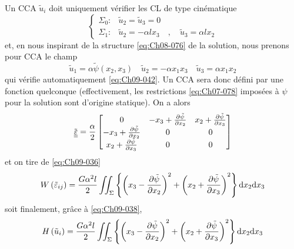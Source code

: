 Un CCA $\tilde{u}_i$ doit uniquement vérifier les CL de type cinématique 
\begin{equation}
    \left\{
    \begin{aligned}
        \Sigma_0: & \tilde{u}_2 = \tilde{u}_3 = 0 \\
        \Sigma_1: & \tilde{u}_2 = -\alpha l x_3 \quad, \quad \tilde{u}_3 = \alpha l x_2
    \end{aligned}
    \right.
    \label{eq:Ch09-042}
\end{equation}
et, en nous inspirant de la structure \eqref{eq:Ch08-076} de la solution, nous prenons pour CCA le champ 
\begin{equation}
    \tilde{u}_1 = \alpha \tilde{\psi} (x_2, x_3) \quad \tilde{u}_2 = -\alpha x_1 x_3 \quad \tilde{u}_3 = \alpha x_1 x_2
    \label{eq:Ch09-043}
\end{equation}
qui vérifie automatiquement \eqref{eq:Ch09-042}.
Un CCA sera donc défini par une fonction quelconque (effectivement, les restrictions \eqref{eq:Ch07-078} imposées à $\psi$ pour la solution sont d'origine statique).
On a alors
\begin{equation}
    \tilde{\underline{\underline{\varepsilon}}} = \frac{\alpha}{2}
    \begin{bmatrix}
        0 & -x_3 + \frac{\partial \tilde{\psi}}{\partial x_2} & x_2 + \frac{\partial \tilde{\psi}}{\partial x_3} \\
        -x_3 + \frac{\partial \tilde{\psi}}{\partial x_2} & 0 & 0 \\
        x_2 + \frac{\partial \tilde{\psi}}{\partial x_3} & 0 & 0
    \end{bmatrix}
    \label{eq:Ch09-044}
\end{equation}
et on tire de \eqref{eq:Ch09-036} 
\begin{equation}
    W \left( \tilde{\varepsilon}_{ij} \right) = \frac{G\alpha^2 l}{2} \iint_{\Sigma} \left\{ \left( x_3 - \frac{\partial \tilde{\psi}}{\partial x_2} \right)^2 + \left( x_2 + \frac{\partial \tilde{\psi}}{\partial x_3} \right)^2 \right\}\mathrm{d} x_2 \mathrm{d} x_3
    \label{eq:Ch09-045}
\end{equation}
soit finalement, grâce à \eqref{eq:Ch09-038}, 
\begin{equation}
    H \left( \tilde{u}_{i} \right) = \frac{G\alpha^2 l}{2} \iint_{\Sigma} \left\{ \left( x_3 - \frac{\partial \tilde{\psi}}{\partial x_2} \right)^2 + \left( x_2 + \frac{\partial \tilde{\psi}}{\partial x_3} \right)^2 \right\}\mathrm{d} x_2 \mathrm{d} x_3
    \label{eq:Ch09-045}
\end{equation}

